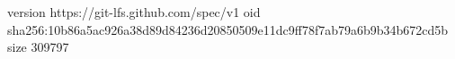 version https://git-lfs.github.com/spec/v1
oid sha256:10b86a5ac926a38d89d84236d20850509e11dc9ff78f7ab79a6b9b34b672cd5b
size 309797
